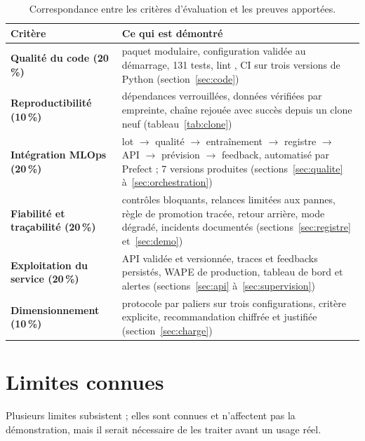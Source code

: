 \documentclass[11pt,a4paper]{article}
\newcommand{\code}[1]{\texttt{\detokenize{#1}}}
\begin{document}
\begin{table}[htbp]\centering\small
\begin{tabularx}{\linewidth}{>{\bfseries}p{3.2cm} X}
\toprule
Critère & Ce qui est démontré\\
\midrule
Qualité du code (20\,\%) & paquet modulaire, configuration validée au démarrage, 131 tests, lint \code{ruff}, CI sur trois versions de Python (section~\ref{sec:code})\\
Reproductibilité (10\,\%) & dépendances verrouillées, données vérifiées par empreinte, chaîne rejouée avec succès depuis un clone neuf (tableau~\ref{tab:clone})\\
Intégration MLOps (20\,\%) & lot $\rightarrow$ qualité $\rightarrow$ entraînement $\rightarrow$ registre $\rightarrow$ API $\rightarrow$ prévision $\rightarrow$ feedback, automatisé par Prefect ; 7 versions produites (sections~\ref{sec:qualite} à~\ref{sec:orchestration})\\
Fiabilité et traçabilité (20\,\%) & contrôles bloquants, relances limitées aux pannes, règle de promotion tracée, retour arrière, mode dégradé, incidents documentés (sections~\ref{sec:registre} et~\ref{sec:demo})\\
Exploitation du service (20\,\%) & API validée et versionnée, traces et feedbacks persistés, WAPE de production, tableau de bord et alertes (sections~\ref{sec:api} à~\ref{sec:supervision})\\
Dimensionnement (10\,\%) & protocole par paliers sur trois configurations, critère explicite, recommandation chiffrée et justifiée (section~\ref{sec:charge})\\
\bottomrule
\end{tabularx}
\caption{Correspondance entre les critères d'évaluation et les preuves apportées.}\label{tab:bilan}
\end{table}

\section{Limites connues}\label{sec:limites}

Plusieurs limites subsistent ; elles sont connues et n'affectent pas la démonstration, mais
il serait nécessaire de les traiter avant un usage réel.
\end{document}
